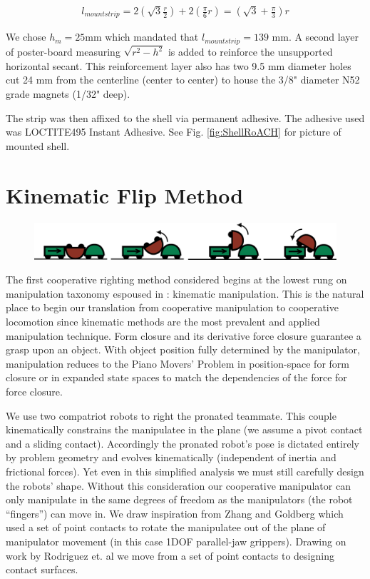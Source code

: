 \documentclass[letterpaper, 10 pt, conference]{ieeeconf}
\begin{document}
\begin{align}
l_{mountstrip} = 2 (\sqrt{3} \frac{r}{2}) + 2 (\frac{\pi}{6} r) = (\sqrt{3} + \frac{\pi}{3} ) r
\end{align}

We chose $h_m = 25$mm which mandated that $l_{mountstrip} = 139$ mm.
A second layer of poster-board measuring $\sqrt{r^2-h^2}$ is added to reinforce the unsupported horizontal secant.
This reinforcement layer also has two 9.5 mm diameter holes cut 24 mm from the centerline (center to center) to house the 3/8" diameter N52 grade magnets (1/32" deep).

The strip was then affixed to the shell via permanent adhesive. The adhesive used was LOCTITE495 Instant Adhesive.
See Fig. \ref{fig:ShellRoACH} for picture of mounted shell.





\section{Kinematic Flip Method}
\begin{figure}[ht]
\centering
\includegraphics[width=1.0\columnwidth]{Kinematic_CoopCartoon.png}
\end{figure}

The first cooperative righting method considered begins at the lowest rung on manipulation taxonomy espoused in \cite{MasonMORMBook}: kinematic manipulation.
This is the natural place to begin our translation from cooperative manipulation to cooperative locomotion since kinematic methods are the most prevalent and applied manipulation technique.
Form closure and its derivative force closure guarantee a grasp upon an object.
With object position fully determined by the manipulator, manipulation reduces to the Piano Movers' Problem in position-space for form closure or in expanded state spaces to match the dependencies of the force for force closure.

We use two compatriot robots to right the pronated teammate. This couple kinematically constrains the manipulatee in the plane (we assume a pivot contact and a sliding contact).
Accordingly the pronated robot's pose is dictated entirely by problem geometry and evolves kinematically (independent of inertia and frictional forces).
Yet even in this simplified analysis we must still carefully design the robots' shape. Without this consideration our cooperative manipulator can only manipulate in the same degrees of freedom as the manipulators (the robot ``fingers'') can move in.
We draw inspiration from Zhang and Goldberg \cite{zhang2002gripper} which used a set of point contacts to rotate the manipulatee out of the plane of manipulator movement (in this case 1DOF parallel-jaw grippers).
Drawing on work by Rodriguez et. al \cite{rodriguez2013effector} we move from a set of point contacts to designing contact surfaces.
\end{document}

